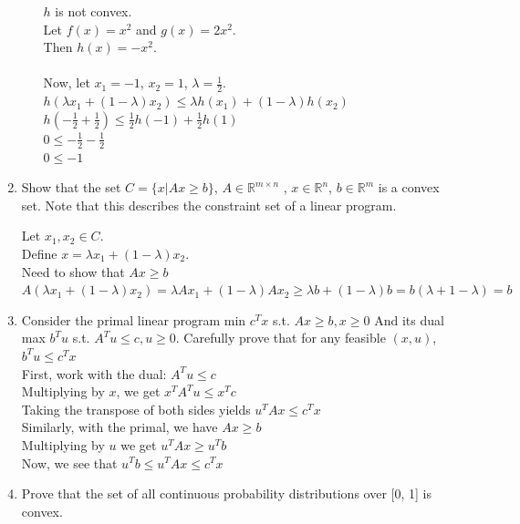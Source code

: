 \documentclass[12pt]{article}
\begin{document}
\begin{enumerate}
\begin{enumerate}
    $h$ is not convex.\\
    Let $f(x) = x^2$ and $g(x) = 2x^2$.\\
    Then $h(x) = -x^2$.\\\\
    Now, let $x_1 = -1$, $x_2 = 1$, $\lambda = \frac{1}{2}$.\\
    $h(\lambda x_1 + (1 - \lambda)x_2) \leq
      \lambda h(x_1) + (1 - \lambda)h(x_2)$\\
    $h(-\frac{1}{2} + \frac{1}{2}) \leq
      \frac{1}{2}h(-1) + \frac{1}{2}h(1)$\\
    $0 \leq -\frac{1}{2} - \frac{1}{2}$\\
    $0 \leq -1$\\
  \end{enumerate}

  \item Show that the set $C=\{x|Ax \geq b\}$, $A \in \mathbb{R}^{m\times n}$
    , $x \in \mathbb{R}^n$, $b \in \mathbb{R}^m$ is a convex set. Note
    that this describes the constraint set of a linear program.

    Let $x_1, x_2\in C$.\\
    Define $x = \lambda x_1 + (1 - \lambda)x_2$.\\
    Need to show that $Ax\geq b$\\
    $A(\lambda x_1 + (1-\lambda)x_2) =
      \lambda Ax_1 + (1-\lambda)Ax_2\geq
      \lambda b + (1-\lambda)b =
      b(\lambda + 1 - \lambda) = b$\\

  \item Consider the primal linear program
    min $c^Tx$ s.t. $Ax\geq b, x\geq 0$
    And its dual
    max $b^Tu$ s.t. $A^Tu\leq c, u\geq 0$.
    Carefully prove that for any feasible $(x, u)$, $b^Tu\leq c^Tx$\\

    First, work with the dual: $A^Tu\leq c$\\ Multiplying by $x$, we get
    $x^TA^Tu\leq x^Tc$\\
    Taking the transpose of both sides yields $u^TAx\leq c^Tx$\\
    Similarly, with the primal, we have $Ax\geq b$\\
    Multiplying by $u$ we get $u^TAx\geq u^Tb$\\
    Now, we see that $u^Tb\leq u^TAx\leq c^Tx$
  \item Prove that the set of all continuous probability distributions over
    [0, 1] is convex.\\


\end{enumerate}
\end{document}
